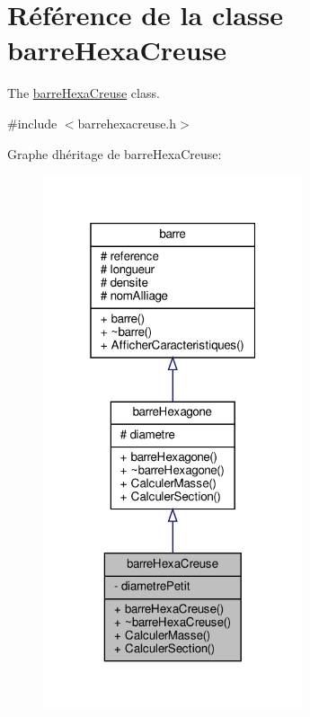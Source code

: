 \hypertarget{classbarre_hexa_creuse}{}\section{Référence de la classe barre\+Hexa\+Creuse}
\label{classbarre_hexa_creuse}


The \hyperlink{classbarre_hexa_creuse}{barre\+Hexa\+Creuse} class.  




{\ttfamily \#include $<$barrehexacreuse.\+h$>$}



Graphe d\textquotesingle{}héritage de barre\+Hexa\+Creuse\+:
\nopagebreak
\begin{figure}[H]
\begin{center}
\leavevmode
\includegraphics[width=217pt]{classbarre_hexa_creuse__inherit__graph}
\end{center}
\end{figure}



